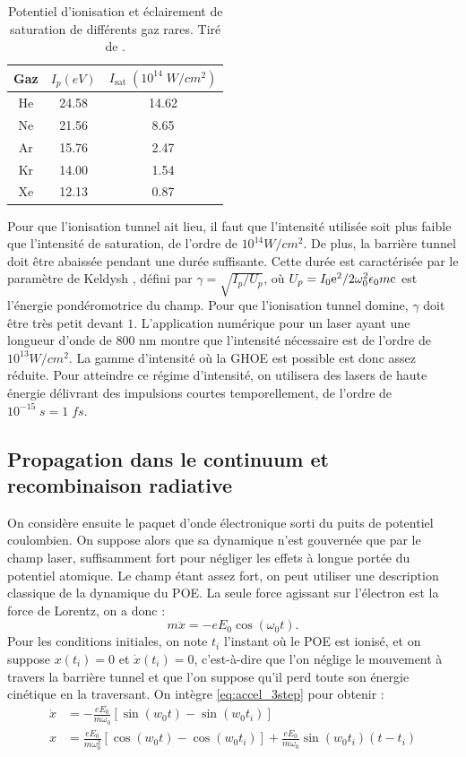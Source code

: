 \begin{table}[h!]
\begin{tabular}{|c|c|c|}
  \hline
  Gaz & $I_p (\si{eV})$ & $I_{\text{sat}}\;(10^{14}\;\si{W/cm^2})$\\
  \hline
  He & 24.58 & 14.62 \\
  Ne & 21.56 & 8.65 \\
	Ar & 15.76 & 2.47 \\
	Kr & 14.00 & 1.54\\
	Xe & 12.13 & 0.87 \\
  \hline	
\end{tabular}
\centering
\caption{Potentiel d'ionisation et éclairement de saturation de différents gaz rares. Tiré de .}
\label{tab:Isat}
\end{table}
Pour que l'ionisation tunnel ait lieu, il faut que l'intensité utilisée soit plus faible que l'intensité de saturation, de l'ordre de $10^{14}\si{W/cm^2}$. De plus, la barrière tunnel doit être abaissée pendant une durée suffisante. Cette durée est caractérisée par le paramètre de Keldysh , défini par $\gamma = \sqrt{I_p/U_p}$, où $U_p = I_0 \mathrm{e}^2/2\omega_0^2\epsilon_0 m \mathrm{c}$ est l'énergie pondéromotrice du champ. Pour que l'ionisation tunnel domine, $\gamma$ doit être très petit devant $1$. L'application numérique pour un laser ayant une longueur d'onde de 800 nm montre que l'intensité nécessaire est de l'ordre de ${10^{13}}\si{W/cm^2}$. La gamme d'intensité où la GHOE est possible est donc assez réduite. Pour atteindre ce régime d'intensité, on utilisera des lasers de haute énergie délivrant des impulsions courtes temporellement, de l'ordre de $10^{-15}\;s = 1\;fs$.

\subsection{Propagation dans le continuum et recombinaison radiative}
On considère ensuite le paquet d'onde électronique sorti du puits de potentiel coulombien. On suppose alors que sa dynamique n'est gouvernée que par le champ laser, suffisamment fort pour négliger les effets à longue portée du potentiel atomique. Le champ étant assez fort, on peut utiliser une description classique de la dynamique du POE. La seule force agissant sur l'électron est la force de Lorentz, on a donc :
\begin{equation}
m\ddot{x} = -eE_0 \cos(\omega_0 t).
\label{eq:accel_3step}
\end{equation}
Pour les conditions initiales, on note $t_i$ l'instant où le POE est ionisé, et on suppose $x(t_i) = 0$ et $\dot{x}(t_i) = 0$, c'est-à-dire que l'on néglige le mouvement à travers la barrière tunnel et que l'on suppose qu'il perd toute son énergie cinétique en la traversant. On intègre \ref{eq:accel_3step} pour obtenir :
\begin{align}
\dot{x}&=-\frac{eE_0}{m\omega_0} [\sin{(w_0t)}-\sin{(w_0t_i)}]\\
x&=\frac{eE_0}{m\omega_0^2} [\cos{(w_0t)}-\cos{(w_0t_i)}]+\frac{eE_0}{m\omega_0}\sin{(w_0t_i)}(t-t_i)
\label{eq:pos_3step}
\end{align}

